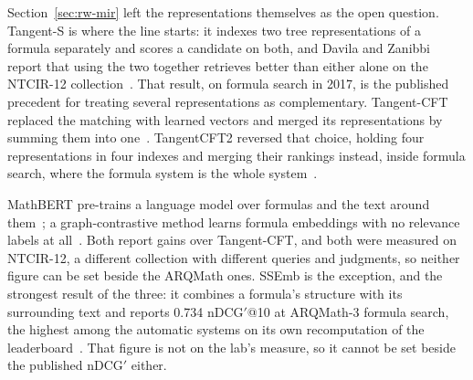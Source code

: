 %

Section~\ref{sec:rw-mir} left the representations themselves as the open question.
Tangent-S is where the line starts: it indexes two tree representations of a formula
separately and scores a candidate on both, and Davila and Zanibbi report that using the
two together retrieves better than either alone on the NTCIR-12
collection~\cite{davila2017tangents}. That result, on formula search in 2017, is the
published precedent for treating several representations as complementary. Tangent-CFT
replaced the matching with learned vectors and merged its representations by summing
them into one~\cite{mansouri2019tangentcft}. TangentCFT2 reversed that choice, holding
four representations in four indexes and merging their rankings instead, inside formula
search, where the formula system is the whole system~\cite{mansouri2022dprl}.

MathBERT pre-trains a language model over formulas and the text around
them~\cite{peng2021mathbert}; a graph-contrastive method learns formula embeddings with
no relevance labels at all~\cite{wang2024gcl}. Both report gains over Tangent-CFT, and
both were measured on NTCIR-12, a different collection with different queries and
judgments, so neither figure can be set beside the ARQMath ones. SSEmb is the exception,
and the strongest result of the three: it combines a formula's structure with its
surrounding text and reports 0.734 nDCG$'$@10 at ARQMath-3 formula search, the highest
among the automatic systems on its own recomputation of the
leaderboard~\cite{li2025ssemb}. That figure is not on the lab's measure, so it cannot be
set beside the published nDCG$'$ either.

